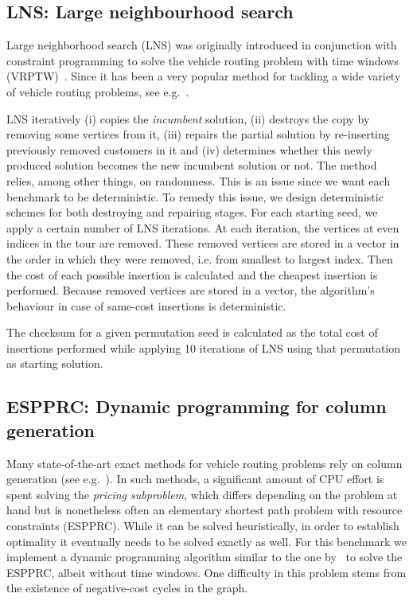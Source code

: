 \documentclass[11pt,a4paper,notitlepage]{article}
\begin{document}
\subsection{LNS: Large neighbourhood search}
Large neighborhood search (LNS) was originally introduced in
conjunction with constraint programming to solve the vehicle routing
problem with time windows (VRPTW)~\cite{lns}. Since it has been
a very popular method for tackling a wide variety of vehicle routing
problems, see e.g.~\cite{lnschapter}.

LNS iteratively (i) copies the \emph{incumbent} solution, (ii)
destroys the copy by removing some vertices from it, (iii) repairs the
partial solution by re-inserting previously removed customers in it
and (iv) determines whether this newly produced solution becomes the
new incumbent solution or not. The method relies, among other
things, on randomness. This is an issue since we want each benchmark
to be deterministic. To remedy this issue, we design deterministic
schemes for both destroying and repairing stages. For each starting
seed, we apply a certain number of LNS iterations. At each iteration,
the vertices at even indices in the tour are removed. These removed
vertices are stored in a vector in the order in which they were
removed, i.e. from smallest to largest index. Then the cost of each
possible insertion is calculated and the cheapest insertion is
performed. Because removed vertices are stored in a vector, the
algorithm's behaviour in case of same-cost insertions is
deterministic. 

The checksum for a given permutation seed is calculated as the total
cost of insertions performed while applying 10 iterations of LNS using
that permutation as starting solution.

\subsection{ESPPRC: Dynamic programming for column generation}
Many state-of-the-art exact methods for vehicle routing problems rely
on column generation (see e.g.~\cite{Baldacci:2012survey}). In such
methods, a significant amount of CPU effort is spent solving the
\emph{pricing subproblem}, which differs depending on the problem at
hand but is nonetheless often an elementary shortest path problem with
resource constraints (ESPPRC). While it can be solved heuristically,
in order to establish optimality it eventually needs to be solved
exactly as well. For this benchmark we implement a dynamic
programming algorithm similar to the one by~\cite{feillet:2004exact}
to solve the ESPPRC, albeit without time windows. One difficulty in
this problem stems from the existence of negative-cost cycles in the
graph. 
\end{document}
